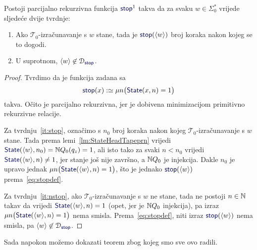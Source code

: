 \begin{lema}\label{lm:stopprek}
Postoji parcijalno rekurzivna funkcija $\f{stop}^1$ takva da za svaku $w\in\Sigma_0^*$ vrijede sljedeće dvije tvrdnje:
\begin{enumerate}
    \item\label{it:stop} Ako $\mathcal T_0$-izračunavanje s $w$ stane, tada je $\f{stop}(\kr w)$ broj koraka nakon kojeg se to dogodi.
    \item\label{it:nstop} U suprotnom, $\kr w\not\in\dom{\f{stop}}$.
\end{enumerate}
\end{lema}
\begin{proof}
Tvrdimo da je funkcija zadana sa
\begin{equation}\label{eq:stopdef}
    \f{stop}(x):\simeq\mu n\bigl(\f{State}(x,n)=1\bigr)
\end{equation}
takva. Očito je parcijalno rekurzivna, jer je dobivena minimizacijom primitivno rekurzivne relacije.

Za tvrdnju~\ref{it:stop}, označimo s $n_0$ broj koraka nakon kojeg $\mathcal T_0$-izračunavanje s $w$ stane. Tada prema lemi~\ref{lm:StateHeadTapeprn} vrijedi $\f{State}(\kr w,n_0)=\N Q_0(q_z)=1$, ali isto tako za svaki $n<n_0$ vrijedi $\f{State}(\kr w,n)\not=1$, jer stanje još nije završno, a ${\mathbb N} Q_0$ je injekcija. Dakle $n_0$ je upravo jednak $\mu n\bigl(\f{State}(\kr w,n)=1\bigr)$, što je jednako $\f{stop}(\kr w)$ prema~\eqref{eq:stopdef}.

Za tvrdnju~\ref{it:nstop}, ako $\mathcal T_0$-izračunavanje s $w$ ne stane, tada ne postoji $n\in{\mathbb N}$ takav da vrijedi $\f{State}(\kr w,n)=1$ (opet, jer je ${\mathbb N} Q_0$ injekcija), pa izraz $\mu n\bigl(\f{State}(\kr w,n)=1\bigr)$ nema smisla. Prema~\eqref{eq:stopdef}, niti izraz $\f{stop}(\kr w)$ nema smisla, pa $\kr w\not\in\dom{\f{stop}}$.
\end{proof}

Sada napokon možemo dokazati teorem zbog kojeg smo sve ovo radili.

